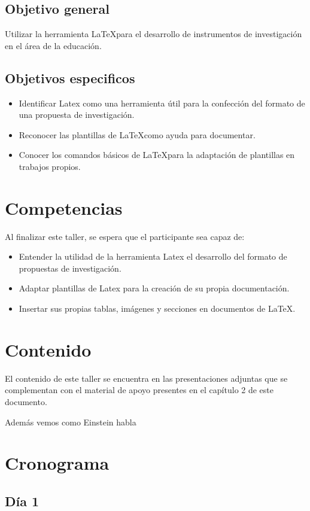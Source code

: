 \documentclass[12pt]{report}
\begin{document}
\subsection{Objetivo general}
Utilizar la herramienta \LaTeX para el desarrollo de instrumentos de investigación en el área de la educación.
\subsection{Objetivos especificos}
\begin{itemize}
\item Identificar Latex como una herramienta útil para la confección del formato de una propuesta de investigación.
\item Reconocer las plantillas de \LaTeX como ayuda para documentar.
\item Conocer los comandos básicos de \LaTeX para la adaptación de plantillas en trabajos propios.
\end{itemize}

\section{Competencias}
Al finalizar este taller, se espera que el participante sea capaz de:
\begin{itemize}
\item Entender la utilidad de la herramienta Latex el desarrollo del formato de propuestas de investigación.
\item Adaptar plantillas de Latex para la creación de su propia documentación.
\item Insertar sus propias tablas, imágenes y secciones en documentos de \LaTeX.
\end{itemize}

\section{Contenido}
El contenido de este taller se encuentra en las presentaciones adjuntas que se complementan con el material de apoyo presentes en el capítulo 2 de este documento.\cite{greenwade93}

Además vemos como Einstein habla \cite{Einstein}
\section{Cronograma}
\subsection{Día 1}
\end{document}
